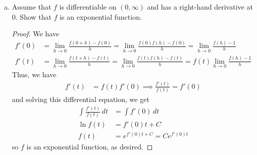 \documentclass{article}
\begin{document}
\begin{enumerate}[(a)]
		\item Assume that $f$ is differentiable on $(0, \infty)$ and has a right-hand derivative at 0. Show that $f$ is an exponential function.
			\begin{proof}
				We have
				\begin{align*}
					f'(0) &= \lim_{h\to 0} \frac{f(0+h)-f(0)}{h} = \lim_{h\to 0} \frac{f(0)f(h)-f(0)}{h} = \lim_{h\to 0}\frac{f(h)-1}{h} \\
					f'(t) &= \lim_{h\to 0} \frac{f(t+h)-f(t)}{h} = \lim_{h\to 0}\frac{f(t)f(h)-f(t)}{h} = f(t) \lim_{h\to 0} \frac{f(h)-1}{h}
				\end{align*}
				Thus, we have
				\begin{align*}
					f'(t) &= f(t) f'(0)\implies \frac{f'(t)}{f(t)} = f'(0)
				\end{align*}
				and solving this differential equation, we get
				\begin{align*}
					\int \frac{f'(t)}{f(t)} \, dt &= \int f'(0)\, dt \\
					\ln f(t) &= f'(0)t + C \\
					f(t) &= e^{f'(0)t + C} = Ce^{f'(0)t}
				\end{align*}
				so $f$ is an exponential function, as desired.
			\end{proof}
			
	\end{enumerate}
\end{document}
